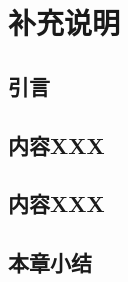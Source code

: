 
\chapter{补充说明}

\section{引言}

\lipsum[2]

\section{内容XXX}

\lipsum[3]

\section{内容XXX}

\lipsum[3]

\section{本章小结}

\lipsum[2]
